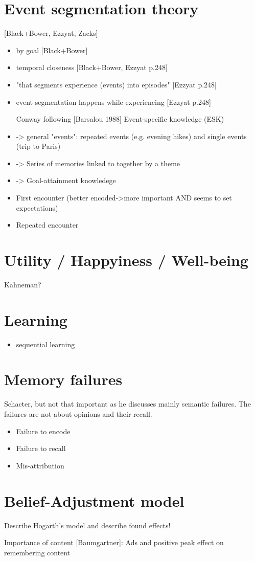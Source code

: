 \section{Event segmentation theory}
[Black+Bower, Ezzyat, Zacks]
\begin{itemize}
\item by goal [Black+Bower]
\item temporal closeness [Black+Bower, Ezzyat p.248]
\item "that segments experience (events) into episodes" [Ezzyat p.248]
\item event segmentation happens while experiencing [Ezzyat p.248]

\item [Conway] following [Barsalou 1988] Event-specific knowledge (ESK)
\item -> general "events": repeated events (e.g. evening hikes) and single events (trip to Paris)
\item -> Series of memories linked to together by a theme
\item -> Goal-attainment knowledege
\item First encounter (better encoded->more important AND seems to set expectations)
\item Repeated encounter
\end{itemize}

\section{Utility / Happyiness / Well-being}
Kahneman?

\section{Learning}
\begin{itemize}
\item sequential learning
\end{itemize}

\section{Memory failures}
Schacter, but not that important as he discusses mainly semantic failures.
The failures are not about opinions and their recall.

\begin{itemize}
\item Failure to encode
\item Failure to recall
\item Mis-attribution
\end{itemize}


\section{Belief-Adjustment model}
Describe Hogarth's model and describe found effects!

Importance of content [Baumgartner]: Ads and positive peak effect on remembering content